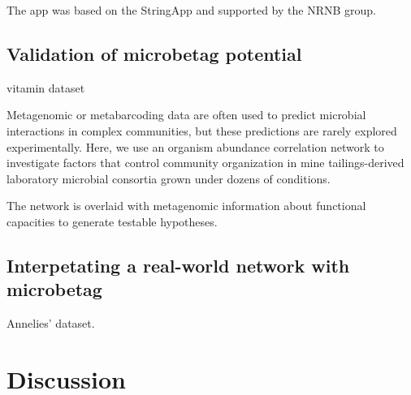 \documentclass[sn-mathphys,Numbered, lineno]{sn-jnl}  %
\theoremstyle{thmstyleone}%
\theoremstyle{thmstyletwo}%
\theoremstyle{thmstylethree}%
\begin{document}
\begin{table}[ht]

            \caption{
                Computating times per step using an abundance table of 400 taxa with taxonomy: 
                A. taxonomy scheme 
                B. 
                C.
                D. 
                \protect\footnotemark[\value{footnote}] specs of the laptop used.
            }
            
            \label{tab:grid}
        \end{table}

        The app was based on the StringApp and supported by the NRNB group.


    \subsection*{Validation of microbetag potential}
    \label{subsec:validation}


        vitamin dataset~\cite{hessler2023vitamin}

        Metagenomic or metabarcoding data are often used to predict microbial interactions in complex communities, but these predictions are rarely explored experimentally. 
        Here, we use an organism abundance correlation network to investigate factors that control community organization in mine tailings-derived laboratory microbial consortia grown under dozens of conditions.

        The network is overlaid with metagenomic information about functional capacities to generate testable hypotheses.


    \subsection*{Interpetating a real-world network with microbetag}
    \label{subsec:usecase}


        Annelies' dataset. 







\section{Discussion}
\label{sec:discussion}
\end{document}
